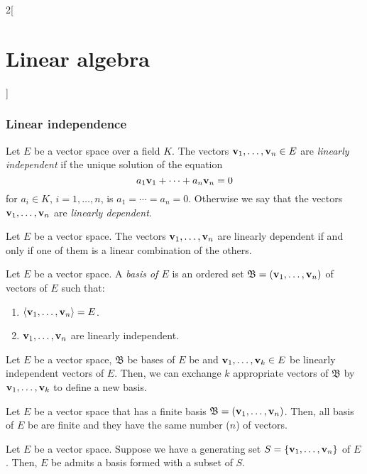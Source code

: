 \documentclass[../../../main.tex]{subfiles}
\begin{document}
\begin{multicols}{2}[\section{Linear algebra}]
\subsubsection*{Linear independence}
\begin{definition}
    Let $E$ be a vector space over a field $K$. The vectors $\vb{v}_1,\ldots,\vb{v}_n\in E$ are \textit{linearly independent} if the unique solution of the equation $$a_1\vb{v}_1+\cdots+a_n\vb{v}_n=0$$ for $a_i\in K$, $i=1,\ldots,n$, is $a_1=\cdots=a_n=0$. Otherwise we say that the vectors $\vb{v}_1,\ldots,\vb{v}_n$ are \textit{linearly dependent}.
\end{definition}
\begin{lemma}
    Let $E$ be a vector space. The vectors $\vb{v}_1,\ldots,\vb{v}_n$ are linearly dependent if and only if one of them is a linear combination of the others.
\end{lemma}
\begin{definition}
    Let $E$ be a vector space. A \textit{basis of $E$} is an ordered set $\mathfrak{B}=(\vb{v}_1,\ldots,\vb{v}_n)$ of vectors of $E$ such that: 
    \begin{enumerate}
        \item $\langle \vb{v}_1,\ldots,\vb{v}_n\rangle = E$.
        \item $\vb{v}_1,\ldots,\vb{v}_n$ are linearly independent.
    \end{enumerate}
\end{definition}
\begin{lemma}
    Let $E$ be a vector space, $\mathfrak{B}$ be bases of $E$ be and $\vb{v}_1,\ldots,\vb{v}_k\in E$ be linearly independent vectors of $E$. Then, we can exchange $k$ appropriate vectors of $\mathfrak{B}$ by $\vb{v}_1,\ldots,\vb{v}_k$ to define a new basis.
\end{lemma}
\begin{corollary}
    Let $E$ be a vector space that has a finite basis $\mathfrak{B}=(\vb{v}_1,\ldots,\vb{v}_n)$. Then, all basis of $E$ be are finite and they have the same number ($n$) of vectors.
\end{corollary}
\begin{lemma}
    Let $E$ be a vector space. Suppose we have a generating set $S=\{\vb{v}_1,\ldots,\vb{v}_n\}$ of $E$. Then, $E$ be admits a basis formed with a subset of $S$.
\end{lemma}

\end{multicols}
\end{document}
